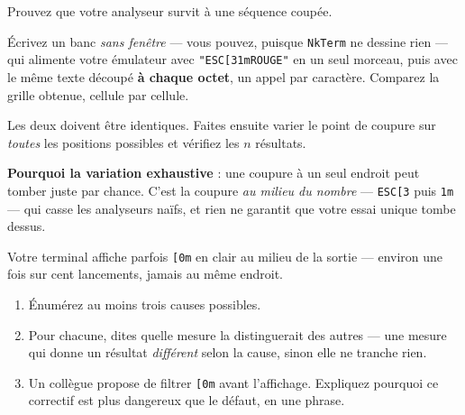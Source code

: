 \begin{nkdemo}
Prouvez que votre analyseur survit à une séquence coupée.

Écrivez un banc \emph{sans fenêtre} --- vous pouvez, puisque
\texttt{NkTerm} ne dessine rien --- qui alimente votre émulateur avec
\texttt{"ESC[31mROUGE"} en un seul morceau, puis avec le même texte découpé
\textbf{à chaque octet}, un appel par caractère. Comparez la grille obtenue,
cellule par cellule.

Les deux doivent être identiques. Faites ensuite varier le point de coupure sur
\emph{toutes} les positions possibles et vérifiez les $n$ résultats.

\textbf{Pourquoi la variation exhaustive} : une coupure à un seul endroit peut
tomber juste par chance. C'est la coupure \emph{au milieu du nombre} ---
\texttt{ESC[3} puis \texttt{1m} --- qui casse les analyseurs naïfs, et rien ne
garantit que votre essai unique tombe dessus.
\end{nkdemo}

\begin{nklogique}
Votre terminal affiche parfois \texttt{[0m} en clair au milieu de la sortie ---
environ une fois sur cent lancements, jamais au même endroit.

\begin{enumerate}
\item Énumérez au moins trois causes possibles.
\item Pour chacune, dites quelle mesure la distinguerait des autres --- une
      mesure qui donne un résultat \emph{différent} selon la cause, sinon elle ne
      tranche rien.
\item Un collègue propose de filtrer \texttt{[0m} avant l'affichage. Expliquez
      pourquoi ce correctif est plus dangereux que le défaut, en une phrase.
\end{enumerate}
\end{nklogique}
